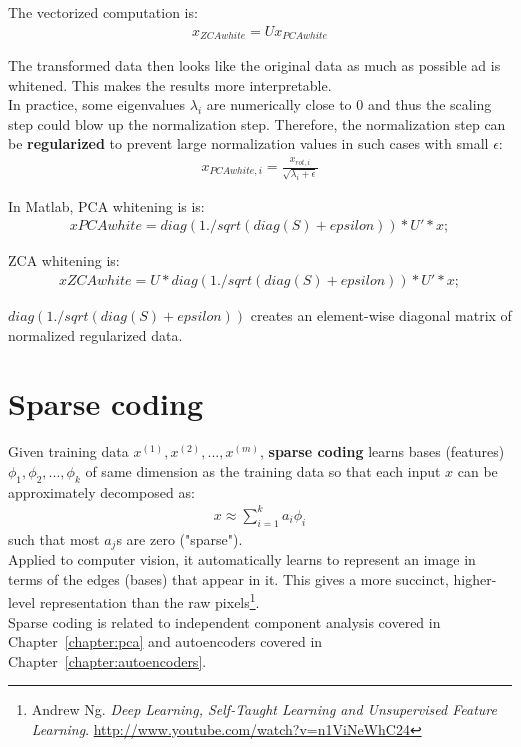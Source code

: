 \documentclass{report}
\begin{document}
The vectorized computation is:
\begin{align*}
x_{ZCAwhite} = Ux_{PCAwhite}
\end{align*}

The transformed data then looks like the original data as much as possible ad is whitened. This makes the results more interpretable.
\\
In practice, some eigenvalues $\lambda_i$ are numerically close to 0 and thus the scaling step could blow up the normalization step.
Therefore, the normalization step can be {\bf regularized} to prevent large normalization values in such cases with small $\epsilon$:
\begin{align*}
x_{PCAwhite,i} = \frac{x_{rot,i}}{\sqrt{\lambda_i+\epsilon}}
\end{align*}

In Matlab, PCA whitening is is:
\begin{align*}
xPCAwhite = diag(1./sqrt(diag(S) + epsilon)) * U' * x;
\end{align*}

ZCA whitening is:
\begin{align*}
xZCAwhite = U * diag(1./sqrt(diag(S) + epsilon)) * U' * x;
\end{align*}

$diag(1./sqrt(diag(S) + epsilon))$ creates an element-wise diagonal matrix of normalized regularized data.

\section{Sparse coding}
\label{chapter:sparsecoding}
Given training data $x^{(1)},x^{(2)},...,x^{(m)}$, {\bf sparse coding} learns bases (features) $\phi_1, \phi_2, ..., \phi_k$ of same dimension as the training data so that each input $x$ can be approximately decomposed as:
\begin{align*}
x \approx \sum_{i=1}^k a_i \phi_i
\end{align*}
such that most $a_j$s are zero ("sparse"). \\
Applied to computer vision, it automatically learns to represent an image in terms of the edges (bases) that appear in it.
This gives a more succinct, higher-level representation than the raw pixels\footnote{Andrew Ng. {\em Deep Learning, Self-Taught Learning and Unsupervised Feature Learning}. \url{http://www.youtube.com/watch?v=n1ViNeWhC24}}.
\\
Sparse coding is related to independent component analysis covered in Chapter~\ref{chapter:pca} and autoencoders covered in Chapter~\ref{chapter:autoencoders}.
\end{document}

